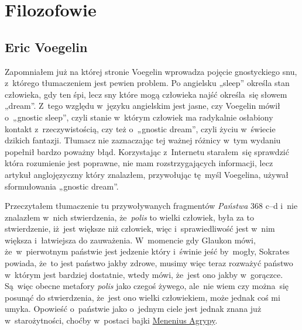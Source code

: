 \documentclass[a4paper,11pt]{article}
\begin{document}
\newpage
\section{Filozofowie}

\vspace{\spaceTwo}



\subsection{Eric Voegelin}

\vspace{\spaceTwo}







\start Zapomniałem już na której stronie Voegelin wprowadza pojęcie
gnostyckiego snu, z~którego tłumaczeniem jest pewien problem. Po
angielsku „sleep” określa stan człowieka, gdy ten śpi, lecz sny
które mogą człowieka najść określa~się słowem „dream”. Z~tego
względu w~języku angielskim jest jasne, czy Voegelin mówił o~„gnostic
sleep”, czyli stanie w~którym człowiek ma radykalnie osłabiony
kontakt z~rzeczywistością, czy też o~„gnostic dream”, czyli życiu
w~świecie dzikich fantazji. Tłumacz nie zaznaczając tej ważnej różnicy
w~tym wydaniu popełnił bardzo poważny błąd. Korzystając z~Internetu
starałem~się sprawdzić która rozumienie jest poprawne, nie mam
rozstrzygających informacji, lecz artykuł anglojęzyczny który
znalazłem, przywołując tę~myśl Voegelina, używał sformułowania
„gnostic dream”.

\vspace{\spaceFour}







\start {} Przeczytałem tłumaczenie tu przywoływanych fragmentów
\textit{Państwa} 368 c--d i~nie znalazłem w~nich stwierdzenia,
że~\textit{polis} to wielki człowiek, była za to stwierdzenie,
iż~jest większe niż człowiek, więc i~sprawiedliwość jest
w~nim większa i~łatwiejsza do zauważenia. W~momencie gdy Glaukon mówi,
że~w~pierwotnym państwie jest jedzenie który i~świnie jeść by~mogły,
Sokrates powiada, że~to jest państwo jakby zdrowe, musimy więc teraz
rozważyć państwo w~którym jest bardziej dostatnie, wtedy mówi, że~jest
ono jakby w~gorączce. Są~więc obecne metafory \textit{polis} jako czegoś
żywego, ale~nie wiem czy można~się posunąć do stwierdzenia, że~jest
ono wielki człowiekiem, może jednak coś mi umyka. Opowieść o~państwie
jako o~jednym ciele jest jednak znana już w~starożytności, choćby
w~postaci bajki
\href{https://en.wikipedia.org/wiki/Agrippa_Menenius_Lanatus_(consul_503_BC)}
{Menenius Agrypy}.
\end{document}
